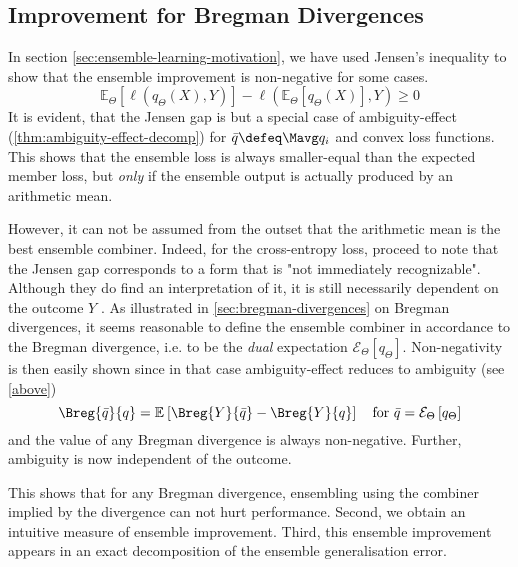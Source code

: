 \documentclass[../main.tex]{subfiles}
\begin{document}
\subsection{Improvement for Bregman Divergences}

In section \ref{sec:ensemble-learning-motivation}, we have used Jensen's inequality to show that the ensemble improvement is non-negative for some cases.
$$
\mathbb{E}_{{\Theta}}\left[ \ell (q_{\Theta}(X),Y) \right]  -
\ell(\mathbb{E}_{\Theta}\left[ q_{\Theta}(X) \right] ,Y ) \geq 0
$$
It is evident, that the Jensen gap is but a special case of ambiguity-effect (\ref{thm:ambiguity-effect-decomp}) for $\bar{q} \defeq \Mavg q_{i}$ and convex loss functions. 
This shows that the ensemble loss is always smaller-equal than the expected member loss, but \textit{only} if the ensemble output is actually produced by an arithmetic mean. 

However, it can not be assumed from the outset that the arithmetic mean is the best ensemble combiner. Indeed, for the cross-entropy loss, \citeauthor{abe} proceed to note that the Jensen gap corresponds to a form that is "not immediately recognizable". Although they do find an interpretation of it, it is still necessarily dependent on the outcome $Y$ 
.
As illustrated in \ref{sec:bregman-divergences} on Bregman divergences, 
it seems reasonable to define the ensemble combiner in accordance to the Bregman divergence, i.e. to be the \textit{dual} expectation $\mathcal{E}_{\Theta}\left[ q_{\Theta} \right]$. 
Non-negativity is then easily shown since in that case ambiguity-effect reduces to ambiguity (see \ref{above})
$$
\Breg{\bar{q}}{q} = \mathbb{E}_{}\left[ \Breg{Y}{\bar{q}} - \Breg{Y}{q} \right]
\hspace{1em} \text{for $\bar{q} = \mathcal{E}_\Theta\left[q_\Theta\right]$}
$$ and the value of any Bregman divergence is always non-negative. Further, ambiguity is now independent of the outcome.

This shows that for any Bregman divergence, ensembling using the combiner implied by the divergence can not hurt performance. Second, we obtain an intuitive measure of ensemble improvement. Third, this ensemble improvement appears in an exact decomposition of the ensemble generalisation error.
\end{document}

